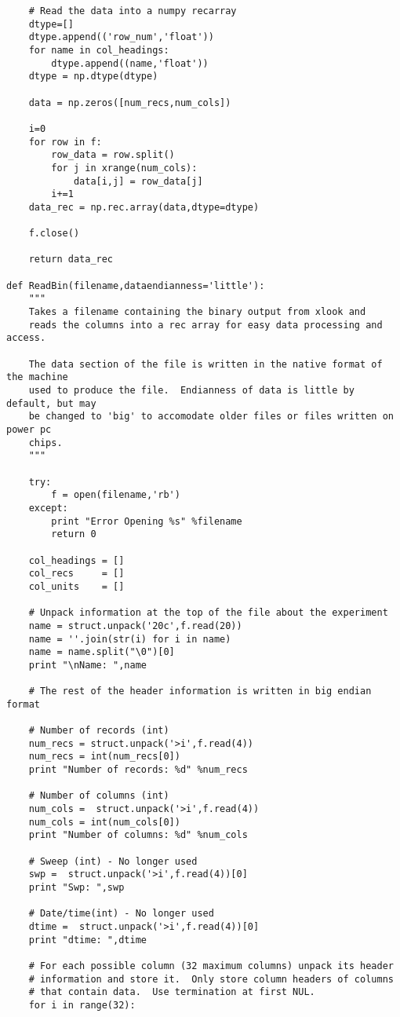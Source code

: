 \documentclass[a4paper,11pt,oneside]{article}
\begin{document}
\begin{lstlisting}
    # Read the data into a numpy recarray
    dtype=[]
    dtype.append(('row_num','float'))
    for name in col_headings:
        dtype.append((name,'float'))
    dtype = np.dtype(dtype)
    
    data = np.zeros([num_recs,num_cols])
    
    i=0
    for row in f:
        row_data = row.split()
        for j in xrange(num_cols):
            data[i,j] = row_data[j]
        i+=1
    data_rec = np.rec.array(data,dtype=dtype)
    
    f.close()
    
    return data_rec

def ReadBin(filename,dataendianness='little'):
    """
    Takes a filename containing the binary output from xlook and
    reads the columns into a rec array for easy data processing and access.
    
    The data section of the file is written in the native format of the machine
    used to produce the file.  Endianness of data is little by default, but may
    be changed to 'big' to accomodate older files or files written on power pc 
    chips.
    """

    try:
        f = open(filename,'rb')
    except:
        print "Error Opening %s" %filename
        return 0
    
    col_headings = []
    col_recs     = []
    col_units    = []
    
    # Unpack information at the top of the file about the experiment
    name = struct.unpack('20c',f.read(20))
    name = ''.join(str(i) for i in name)
    name = name.split("\0")[0]
    print "\nName: ",name
    
    # The rest of the header information is written in big endian format
    
    # Number of records (int)
    num_recs = struct.unpack('>i',f.read(4))
    num_recs = int(num_recs[0])
    print "Number of records: %d" %num_recs
    
    # Number of columns (int)
    num_cols =  struct.unpack('>i',f.read(4))
    num_cols = int(num_cols[0])
    print "Number of columns: %d" %num_cols
    
    # Sweep (int) - No longer used
    swp =  struct.unpack('>i',f.read(4))[0]
    print "Swp: ",swp
    
    # Date/time(int) - No longer used
    dtime =  struct.unpack('>i',f.read(4))[0]
    print "dtime: ",dtime
    
    # For each possible column (32 maximum columns) unpack its header
    # information and store it.  Only store column headers of columns
    # that contain data.  Use termination at first NUL.
    for i in range(32):
    

\end{lstlisting}
\end{document}
